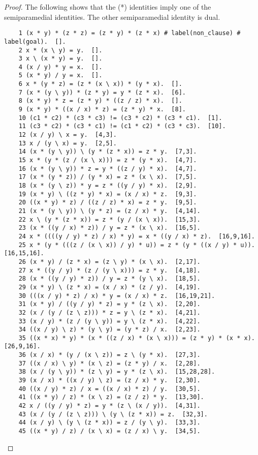 \documentclass[12pt, twoside, openright]{report}
\theoremstyle{definition}
\begin{document}
\begin{proof}
  The following shows that the (*) identities imply one of the semiparamedial identities. The other semiparamedial identity is dual.
	\begin{lstlisting}
    1 (x * y) * (z * z) = (z * y) * (z * x) # label(non_clause) # label(goal).  [].
    2 x * (x \ y) = y.  [].
    3 x \ (x * y) = y.  [].
    4 (x / y) * y = x.  [].
    5 (x * y) / y = x.  [].
    6 x * (y * z) = (z * (x \ x)) * (y * x).  [].
    7 (x * (y \ y)) * (z * y) = y * (z * x).  [6].
    8 (x * y) * z = (z * y) * ((z / z) * x).  [].
    9 (x * y) * ((x / x) * z) = (z * y) * x.  [8].
    10 (c1 * c2) * (c3 * c3) != (c3 * c2) * (c3 * c1).  [1].
    11 (c3 * c2) * (c3 * c1) != (c1 * c2) * (c3 * c3).  [10].
    12 (x / y) \ x = y.  [4,3].
    13 x / (y \ x) = y.  [2,5].
    14 (x * (y \ y)) \ (y * (z * x)) = z * y.  [7,3].
    15 x * (y * (z / (x \ x))) = z * (y * x).  [4,7].
    16 (x * (y \ y)) * z = y * ((z / y) * x).  [4,7].
    17 (x * (y * z)) / (y * x) = z * (x \ x).  [7,5].
    18 (x * (y \ z)) * y = z * ((y / y) * x).  [2,9].
    19 (x * y) \ ((z * y) * x) = (x / x) * z.  [9,3].
    20 ((x * y) * z) / ((z / z) * x) = z * y.  [9,5].
    21 (x * (y \ y)) \ (y * z) = (z / x) * y.  [4,14].
    22 x \ (y * (z * x)) = z * (y / (x \ x)).  [15,3].
    23 (x * ((y / x) * z)) / y = z * (x \ x).  [16,5].
    24 x * ((((y / y) * z) / x) * y) = x * ((y / x) * z).  [16,9,16].
    25 x * (y * (((z / (x \ x)) / y) * u)) = z * (y * ((x / y) * u)).  [16,15,16].
    26 (x * y) / (z * x) = (z \ y) * (x \ x).  [2,17].
    27 x * ((y / y) * (z / (y \ x))) = z * y.  [4,18].
    28 (x * ((y / y) * z)) / y = z * (y \ x).  [18,5].
    29 (x * y) \ (z * x) = (x / x) * (z / y).  [4,19].
    30 (((x / y) * z) / x) * y = (x / x) * z.  [16,19,21].
    31 (x * y) / ((y / y) * z) = y * (z \ x).  [2,20].
    32 (x / (y / (z \ z))) * z = y \ (z * x).  [4,21].
    33 (x / y) * (z / (y \ y)) = y \ (z * x).  [4,22].
    34 ((x / y) \ z) * (y \ y) = (y * z) / x.  [2,23].
    35 ((x * x) * y) * (x * ((z / x) * (x \ x))) = (z * y) * (x * x).  [26,9,16].
    36 (x / x) * (y / (x \ z)) = z \ (y * x).  [27,3].
    37 ((x / x) \ y) * (x \ z) = (z * y) / x.  [2,28].
    38 (x / (y \ y)) * (z \ y) = y * (z \ x).  [15,28,28].
    39 (x / x) * ((x / y) \ z) = (z / x) * y.  [2,30].
    40 ((x / y) * z) / x = ((x / x) * z) / y.  [30,5].
    41 ((x * y) / z) * (x \ z) = (z / z) * y.  [13,30].
    42 x / ((y / y) * z) = y * (z \ (x / y)).  [4,31].
    43 (x / (y / (z \ z))) \ (y \ (z * x)) = z.  [32,3].
    44 (x / y) \ (y \ (z * x)) = z / (y \ y).  [33,3].
    45 ((x * y) / z) / (x \ x) = (z / x) \ y.  [34,5].

\end{lstlisting}
\end{proof}
\end{document}
